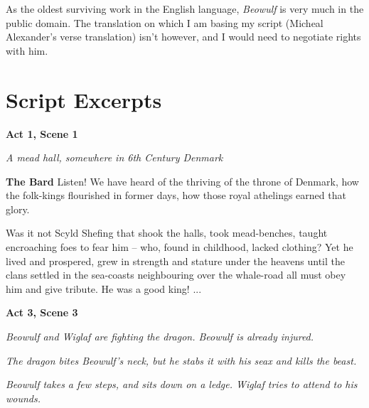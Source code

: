 \documentclass[a4paper]{article}
\begin{document}
As the oldest surviving work in the English language, \textit{Beowulf} is very
much in the public domain. The translation on which I am basing my script 
(Micheal Alexander's verse translation) isn't however, and I would need to 
negotiate rights with him.

\newpage

\section{Script Excerpts}

{\linewise

\centerline{\textbf{Act 1, Scene 1}}
\centerline{\textit{A mead hall, somewhere in 6th Century Denmark}}

\textbf{The Bard} Listen!
We have heard of the thriving of the throne of Denmark,
how the folk-kings flourished in former days,
how those royal athelings earned that glory.

Was it not Scyld Shefing that shook the halls,
took mead-benches, taught encroaching
foes to fear him – who, found in childhood,
lacked clothing? Yet he lived and prospered,
grew in strength and stature under the heavens
until the clans settled in the sea-coasts neighbouring
over the whale-road all must obey him
and give tribute. He was a good king!
...

}

\centerline{\textbf{Act 3, Scene 3}}

\centerline{\textit{Beowulf and Wiglaf are fighting the dragon. Beowulf is already injured.\newline}}

\centerline{\textit{The dragon bites Beowulf's neck, but he stabs it with his seax and kills the beast.\newline}}

\centerline{\textit{Beowulf takes a few steps, and sits down on a ledge. Wiglaf tries to attend to his wounds.}}
\end{document}
